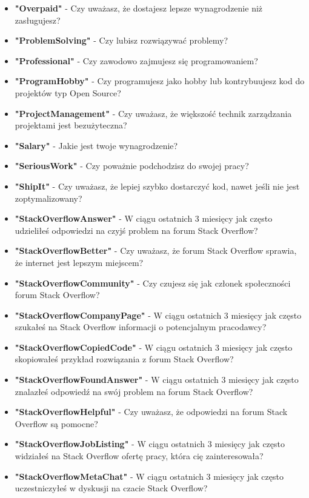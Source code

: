 \begin{appendices}
\begin{itemize}
        \item \textbf{"Overpaid"} - Czy uważasz, że dostajesz lepsze wynagrodzenie niż zasługujesz?
        \item \textbf{"ProblemSolving"} - Czy lubisz rozwiązywać problemy?
        \item \textbf{"Professional"} - Czy zawodowo zajmujesz się programowaniem?
        \item \textbf{"ProgramHobby"} - Czy programujesz jako hobby lub kontrybuujesz kod do projektów typ Open Source?
        \item \textbf{"ProjectManagement"} - Czy uważasz, że większość technik zarządzania projektami jest bezużyteczna?
        \item \textbf{"Salary"} - Jakie jest twoje wynagrodzenie?
        \item \textbf{"SeriousWork"} - Czy poważnie podchodzisz do swojej pracy?
        \item \textbf{"ShipIt"} - Czy uważasz, że lepiej szybko dostarczyć kod, nawet jeśli nie jest zoptymalizowany?
        \item \textbf{"StackOverflowAnswer"} - W ciągu ostatnich 3 miesięcy jak często udzieliłeś odpowiedzi na czyjś problem na forum Stack Overflow?
        \item \textbf{"StackOverflowBetter"} - Czy uważasz, że forum Stack Overflow sprawia, że internet jest lepszym miejscem?
        \item \textbf{"StackOverflowCommunity"} - Czy czujesz się jak członek społeczności forum Stack Overflow?
        \item \textbf{"StackOverflowCompanyPage"} - W ciągu ostatnich 3 miesięcy jak często szukałeś na Stack Overflow informacji o potencjalnym pracodawcy?
        \item \textbf{"StackOverflowCopiedCode"} - W ciągu ostatnich 3 miesięcy jak często skopiowałeś przykład rozwiązania z forum Stack Overflow?
        \item \textbf{"StackOverflowFoundAnswer"} - W ciągu ostatnich 3 miesięcy jak często znalazłeś odpowiedź na swój problem na forum Stack Overflow?
        \item \textbf{"StackOverflowHelpful"} - Czy uważasz, że odpowiedzi na forum Stack Overflow są pomocne?
        \item \textbf{"StackOverflowJobListing"} - W ciągu ostatnich 3 miesięcy jak często widziałeś na Stack Overflow ofertę pracy, która cię zainteresowała?
        \item \textbf{"StackOverflowMetaChat"} - W ciągu ostatnich 3 miesięcy jak często uczestniczyłeś w dyskusji na czacie Stack Overflow?

\end{itemize}
\end{appendices}
